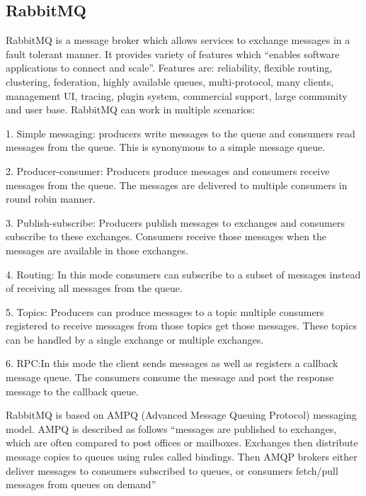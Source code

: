 \subsection{RabbitMQ}

     RabbitMQ is a message broker \cite{www-rabbitmq} which allows
     services to exchange messages in a fault tolerant manner. It
     provides variety of features which ``enables software applications
     to connect and scale''. Features are: reliability, flexible
     routing, clustering, federation, highly available queues,
     multi-protocol, many clients, management UI, tracing, plugin
     system, commercial support, large community and user
     base. RabbitMQ can work in multiple scenarios:

     1. Simple messaging: producers write messages to the queue and
        consumers read messages from the queue. This is synonymous
        to a simple message queue.

     2. Producer-consumer: Producers produce messages and consumers
        receive messages from the queue. The messages are delivered to
        multiple consumers in round robin manner.

     3. Publish-subscribe: Producers publish messages to exchanges
        and consumers subscribe to these exchanges. Consumers receive
        those messages when the messages are available in those
        exchanges.

     4. Routing: In this mode consumers can subscribe to a subset
        of messages instead of receiving all messages from the queue.

     5. Topics: Producers can produce messages to a topic multiple
        consumers registered to receive messages from those topics get
        those messages. These topics can be handled by a single
        exchange or multiple exchanges.

     6. RPC:In this mode the client sends messages as well as
        registers a callback message queue. The consumers consume the
        message and post the response message to the callback queue.

        RabbitMQ is based on AMPQ \cite{ampq-article} (Advanced
        Message Queuing Protocol) messaging model. AMPQ is described
        as follows ``messages are published to exchanges, which are
        often compared to post offices or mailboxes. Exchanges then
        distribute message copies to queues using rules called
        bindings. Then AMQP brokers either deliver messages to
        consumers subscribed to queues, or consumers fetch/pull
        messages from queues on demand''

